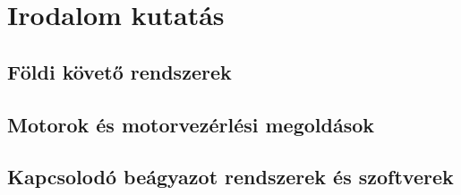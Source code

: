 \chapter{Irodalom kutatás}
\label{chap:irodalom-kutatas}
\section{Földi követő rendszerek}

\section{Motorok és motorvezérlési megoldások}

\section{Kapcsolodó beágyazot rendszerek és szoftverek}
